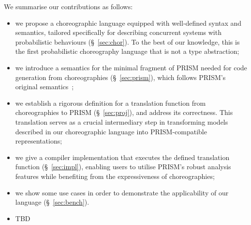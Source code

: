  We summarise our contributions as
follows:
\begin{itemize} 
\item we propose a choreographic language equipped with well-defined
  syntax and semantics, tailored specifically for describing
  concurrent systems with probabilistic behaviours
  (\S~\ref{sec:chor}). To the best of our knowledge, this is the first
  probabilistic choreography language that is not a type abstraction;

\item we introduce a semantics for the minimal fragment of PRISM
  needed for code generation from choreographies (\S~\ref{sec:prism}),
  which follows PRISM's original semantics~\cite{PRISMdoc};

\item we establish a rigorous definition for a translation function
  from choreographies to PRISM (\S~\ref{sec:proj}), and address its
  correctness. This translation serves as a crucial intermediary step
  in transforming models described in our choreographic language into
  PRISM-compatible representations;

\item we give a compiler implementation that executes the defined
  translation function (\S~\ref{sec:impl}),
  enabling users to utilise PRISM's robust analysis features while
  benefiting from the expressiveness of choreographies;

\item we show some use cases in order to demonstrate the applicability
  of our language (\S~\ref{sec:bench}).
\end{itemize}


%
\begin{itemize}
\item TBD
\end{itemize}



